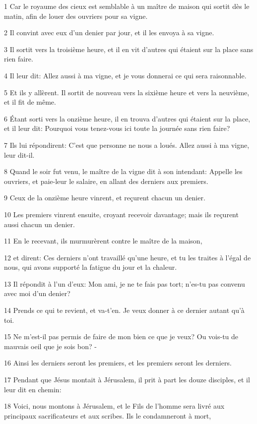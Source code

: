 \par 1 Car le royaume des cieux est semblable à un maître de maison qui sortit dès le matin, afin de louer des ouvriers pour sa vigne.
\par 2 Il convint avec eux d'un denier par jour, et il les envoya à sa vigne.
\par 3 Il sortit vers la troisième heure, et il en vit d'autres qui étaient sur la place sans rien faire.
\par 4 Il leur dit: Allez aussi à ma vigne, et je vous donnerai ce qui sera raisonnable.
\par 5 Et ils y allèrent. Il sortit de nouveau vers la sixième heure et vers la neuvième, et il fit de même.
\par 6 Étant sorti vers la onzième heure, il en trouva d'autres qui étaient sur la place, et il leur dit: Pourquoi vous tenez-vous ici toute la journée sans rien faire?
\par 7 Ils lui répondirent: C'est que personne ne nous a loués. Allez aussi à ma vigne, leur dit-il.
\par 8 Quand le soir fut venu, le maître de la vigne dit à son intendant: Appelle les ouvriers, et paie-leur le salaire, en allant des derniers aux premiers.
\par 9 Ceux de la onzième heure vinrent, et reçurent chacun un denier.
\par 10 Les premiers vinrent ensuite, croyant recevoir davantage; mais ils reçurent aussi chacun un denier.
\par 11 En le recevant, ils murmurèrent contre le maître de la maison,
\par 12 et dirent: Ces derniers n'ont travaillé qu'une heure, et tu les traites à l'égal de nous, qui avons supporté la fatigue du jour et la chaleur.
\par 13 Il répondit à l'un d'eux: Mon ami, je ne te fais pas tort; n'es-tu pas convenu avec moi d'un denier?
\par 14 Prends ce qui te revient, et va-t'en. Je veux donner à ce dernier autant qu'à toi.
\par 15 Ne m'est-il pas permis de faire de mon bien ce que je veux? Ou vois-tu de mauvais oeil que je sois bon? -
\par 16 Ainsi les derniers seront les premiers, et les premiers seront les derniers.
\par 17 Pendant que Jésus montait à Jérusalem, il prit à part les douze disciples, et il leur dit en chemin:
\par 18 Voici, nous montons à Jérusalem, et le Fils de l'homme sera livré aux principaux sacrificateurs et aux scribes. Ils le condamneront à mort,
